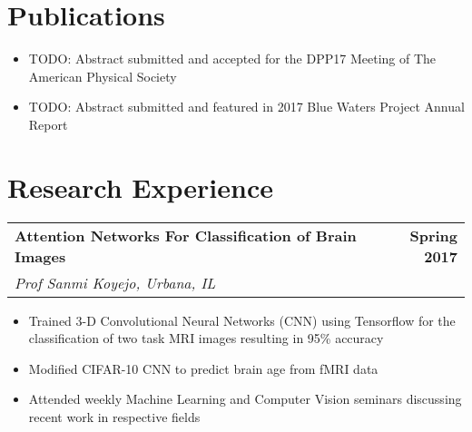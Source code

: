 \documentclass[letterpaper]{article}
\newenvironment{details}
{\begin{itemize}}
{\end{itemize}}
\begin{document}
   \section{Publications}
  \noindent
  \begin{details}
  	\item TODO: Abstract submitted and accepted for the DPP17 Meeting of The American Physical Society
  	\item TODO: Abstract submitted and featured in 2017 Blue Waters Project Annual Report
  \end{details}

  \section{Research Experience}
  \noindent
  \begin{tabularx}{\textwidth}{@{}X r@{}}
  \textbf{Attention Networks For Classification of Brain Images} & \textbf{Spring 2017} \\
  \textit{Prof Sanmi Koyejo, Urbana, IL }
  \end{tabularx}
  \begin{details}
    \item Trained 3-D Convolutional Neural Networks (CNN) using Tensorflow for the classification of two task MRI images resulting in 95\% accuracy
    \item Modified CIFAR-10 CNN to predict brain age from fMRI data
    \item Attended weekly Machine Learning and Computer Vision seminars discussing recent work in respective fields
  \end{details}
  

\end{document}
